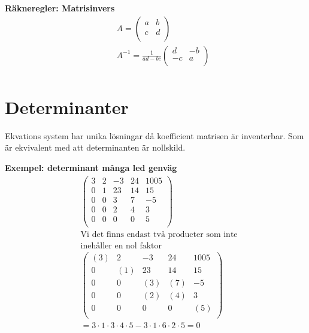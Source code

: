 \begin{multicols}{2}
\textbf{Räkneregler: Matrisinvers }
\begin{align*}
  &\quad  A =
  \left(\begin{array}{cc}
    a & b  \\
    c & d  \\
  \end{array}\right) \\
  &\quad  A^{-1} = \frac{1}{ad-bc} 
  \left(\begin{array}{cc}
    d  & -b  \\
    -c & a  \\
  \end{array}\right) \\
\end{align*}


\section{Determinanter}
Ekvations system har unika lösningar då koefficient matrisen är inventerbar.
Som är ekvivalent med att determinanten är nollskild.

\textbf{Exempel: determinant många led genväg }
\begin{align*}
  &\left(\begin{array}{ccccc}
    3 & 2 & -3 & 24 & 1005 \\
    0 & 1 & 23 & 14 & 15 \\
    0 & 0 & 3  & 7  & -5 \\
    0 & 0 & 2  & 4  & 3 \\
    0 & 0 & 0  & 0  & 5 \\
  \end{array}\right) \\
  &\text{Vi det finns endast två producter som inte} \\
  &\text{inehåller en nol faktor} \\
  &\left(\begin{array}{ccccc}
    (3) & 2 & -3 & 24 & 1005 \\
    0 & (1) & 23 & 14 & 15 \\
    0 & 0 & (3)  & (7)  & -5 \\
    0 & 0 & (2)  & (4)  & 3 \\
    0 & 0 & 0  & 0  & (5) \\
  \end{array}\right) \\
  &= 3\cdot{1}\cdot{3}\cdot{4}\cdot{5}-3\cdot{1}\cdot{6}\cdot{2}\cdot{5}=0
\end{align*}


\end{multicols}
